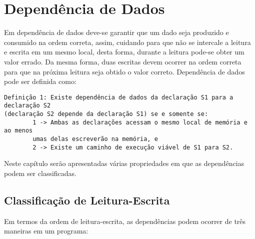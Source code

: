 \section{Dependência de Dados}

Em dependência de dados deve-se garantir que um dado seja produzido e consumido
na ordem correta, assim, cuidando para que não se intercale a leitura e
escrita em um mesmo local, desta forma, durante a leitura pode-se obter um valor 
errado. Da mesma forma, duas escritas devem ocorrer na ordem correta para que na
próxima leitura seja obtido o valor correto.
Dependência de dados pode ser definida como:

\begin{verbatim}
Definição 1: Existe dependência de dados da declaração S1 para a declaração S2
(declaração S2 depende da declaração S1) se e somente se:
        1 -> Ambas as declarações acessam o mesmo local de memória e ao menos
        umas delas escreverão na memória, e
        2 -> Existe um caminho de execução viável de S1 para S2.
\end{verbatim}

Neste capítulo serão apresentadas várias propriedades em que as dependências 
podem ser classificadas.


\subsection{Classificação de Leitura-Escrita}

Em termos da ordem de leitura-escrita, as dependências podem ocorrer de três
maneiras em um programa:

